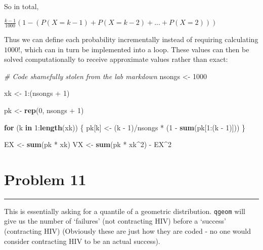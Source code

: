 \documentclass[]{tufte-handout}
\newenvironment{Shaded}{}{}
\newcommand{\CommentTok}[1]{\textcolor[rgb]{0.38,0.63,0.69}{\textit{#1}}}
\newcommand{\ControlFlowTok}[1]{\textcolor[rgb]{0.00,0.44,0.13}{\textbf{#1}}}
\newcommand{\DecValTok}[1]{\textcolor[rgb]{0.25,0.63,0.44}{#1}}
\newcommand{\KeywordTok}[1]{\textcolor[rgb]{0.00,0.44,0.13}{\textbf{#1}}}
\newcommand{\NormalTok}[1]{#1}
\newcommand{\OperatorTok}[1]{\textcolor[rgb]{0.40,0.40,0.40}{#1}}
\newcommand{\StringTok}[1]{\textcolor[rgb]{0.25,0.44,0.63}{#1}}
\begin{document}
So in total,

\(\frac{k-1}{1000}(1-(P(X=k-1) + P(X = k-2) + ... + P(X = 2)))\)

Thus we can define each probability incrementally instead of requiring
calculating \(1000!\), which can in turn be implemented into a loop.
These values can then be solved computationally to receive approximate
values rather than exact:

\begin{Shaded}
\begin{Highlighting}[]
\CommentTok{# Code shamefully stolen from the lab markdown}
\NormalTok{nsongs <-}\StringTok{ }\DecValTok{1000}

\NormalTok{xk <-}\StringTok{ }\DecValTok{1}\OperatorTok{:}\NormalTok{(nsongs }\OperatorTok{+}\StringTok{ }\DecValTok{1}\NormalTok{)}

\NormalTok{pk <-}\StringTok{ }\KeywordTok{rep}\NormalTok{(}\DecValTok{0}\NormalTok{, nsongs }\OperatorTok{+}\StringTok{ }\DecValTok{1}\NormalTok{)}

\ControlFlowTok{for}\NormalTok{ (k }\ControlFlowTok{in} \DecValTok{1}\OperatorTok{:}\KeywordTok{length}\NormalTok{(xk)) \{}
\NormalTok{    pk[k] <-}\StringTok{ }\NormalTok{(k }\OperatorTok{-}\StringTok{ }\DecValTok{1}\NormalTok{)}\OperatorTok{/}\NormalTok{nsongs }\OperatorTok{*}\StringTok{ }\NormalTok{(}\DecValTok{1} \OperatorTok{-}\StringTok{ }\KeywordTok{sum}\NormalTok{(pk[}\DecValTok{1}\OperatorTok{:}\NormalTok{(k }\OperatorTok{-}\StringTok{ }\DecValTok{1}\NormalTok{)]))}
\NormalTok{\}}

\NormalTok{EX <-}\StringTok{ }\KeywordTok{sum}\NormalTok{(pk }\OperatorTok{*}\StringTok{ }\NormalTok{xk)}
\NormalTok{VX <-}\StringTok{ }\KeywordTok{sum}\NormalTok{(pk }\OperatorTok{*}\StringTok{ }\NormalTok{xk}\OperatorTok{^}\DecValTok{2}\NormalTok{) }\OperatorTok{-}\StringTok{ }\NormalTok{EX}\OperatorTok{^}\DecValTok{2}
\end{Highlighting}
\end{Shaded}

\hypertarget{problem-11}{%
\section{Problem 11}\label{problem-11}}

\begin{center}\rule{0.5\linewidth}{0.5pt}\end{center}

This is essentially asking for a quantile of a geometric distribution.
\texttt{qgeom} will give us the number of `failures' (not contracting
HIV) before a `success' (contracting HIV) (Obviously these are just how
they are coded - no one would consider contracting HIV to be an actual
success).
\end{document}

